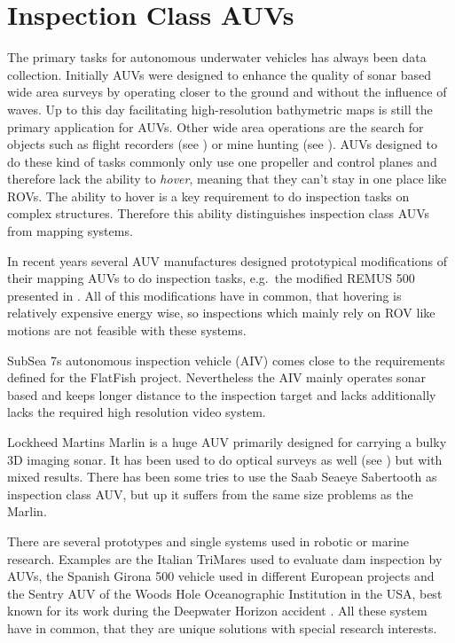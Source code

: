 \documentclass[conference]{IEEEtran}
\begin{document}
\section{Inspection Class AUVs}

The primary tasks for autonomous underwater vehicles has always been data collection.
Initially AUVs were designed to enhance the quality of sonar based wide area surveys by
operating closer to the ground and without the influence of waves. Up to this day
facilitating high-resolution bathymetric maps is still the primary application for AUVs.
Other wide area operations are the search for objects such as flight recorders (see
\cite{purcell2011}) or mine hunting (see \cite{Couillard2012}). AUVs designed to do these
kind of tasks commonly only use one propeller and control planes and therefore lack the
ability to \textit{hover}, meaning that they can't stay in one place like ROVs. The
ability to hover is a key requirement to do inspection tasks on complex structures.
Therefore this ability distinguishes inspection class AUVs from mapping systems.

In recent years several AUV manufactures designed prototypical modifications of their
mapping AUVs to do inspection tasks, e.g.~the modified REMUS 500 presented in
\cite{packard2010}. All of this modifications have in common, that hovering is relatively
expensive energy wise, so inspections which mainly rely on ROV like motions are not
feasible with these systems.

SubSea 7s autonomous inspection vehicle (AIV) \cite{AIV} comes close to the requirements
defined for the FlatFish project. Nevertheless the AIV mainly operates sonar based and
keeps longer distance to the inspection target and lacks additionally lacks the required
high resolution video system.

Lockheed Martins Marlin \cite{Marlinmk1} is a huge AUV primarily designed for carrying a
bulky 3D imaging sonar. It has been used to do optical surveys as well (see
\cite{mcleod2013}) but with mixed results. There has been some tries to use the Saab
Seaeye Sabertooth \cite{johansson2010} as inspection class AUV, but up it suffers from the
same size problems as the Marlin. 

There are several prototypes and single systems used in robotic or marine research.
Examples are the Italian TriMares \cite{cruz2011} used to evaluate dam inspection by AUVs,
the Spanish Girona 500 vehicle \cite{ribas2012} used in different European projects and
the Sentry AUV of the Woods Hole Oceanographic Institution in the USA, best known for its
work during the Deepwater Horizon accident \cite{Kinsey2011}. All these system have in
common, that they are unique solutions with special research interests.
\end{document}
